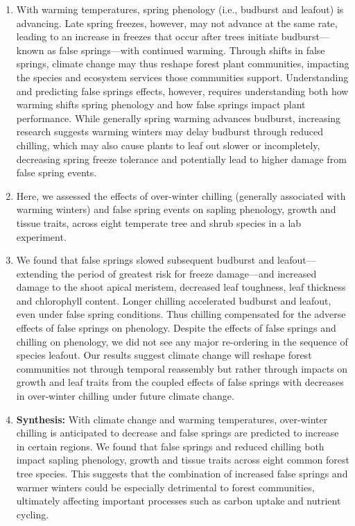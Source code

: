 \documentclass{article}\usepackage[]{graphicx}\usepackage[]{color}
\begin{document}
\begin{enumerate}
\item  With warming temperatures, spring phenology (i.e., budburst and leafout) is advancing. Late spring freezes, however, may not advance at the same rate, leading to an increase in freezes that occur after trees initiate budburst---known as false springs---with continued warming. Through shifts in false springs, climate change may thus reshape forest plant communities, impacting the species and ecosystem services those communities support. Understanding and predicting false springs effects, however, requires understanding both how warming shifts spring phenology and how false springs impact plant performance. While generally spring warming advances budburst, increasing research suggests warming winters may delay budburst through reduced chilling, which may also cause plants to leaf out slower or incompletely, decreasing spring freeze tolerance and potentially lead to higher damage from false spring events. 
\item Here, we assessed the effects of over-winter chilling (generally associated with warming winters) and false spring events on sapling phenology, growth and tissue traits, across eight temperate tree and shrub species in a lab experiment. 
\item We found that false springs slowed subsequent budburst and leafout---extending the period of greatest risk for freeze damage---and increased damage to the shoot apical meristem, decreased leaf toughness, leaf thickness and chlorophyll content. Longer chilling accelerated budburst and leafout, even under false spring conditions. Thus chilling compensated for the adverse effects of false springs on phenology. Despite the effects of false springs and chilling on phenology, we did not see any major re-ordering in the sequence of species leafout. Our results suggest climate change will reshape forest communities not through temporal reassembly but rather through impacts on growth and leaf traits from the coupled effects of false springs with decreases in over-winter chilling under future climate change. 

\item \textbf{Synthesis:} With climate change and warming temperatures, over-winter chilling is anticipated to decrease and false springs are predicted to increase in certain regions. We found that false springs and reduced chilling both impact sapling phenology, growth and tissue traits across eight common forest tree species. This suggests that the combination of increased false springs and warmer winters could be especially detrimental to forest communities, ultimately affecting important processes such as carbon uptake and nutrient cycling. %
\end{enumerate}
\end{document}
